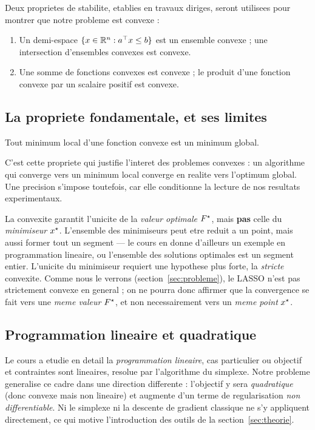 Deux proprietes de stabilite, etablies en travaux diriges, seront utilisees
pour montrer que notre probleme est convexe :
\begin{proposition}
\label{prop:stabilite}
\leavevmode
\begin{enumerate}
  \item Un demi-espace $\{x \in \mathbb{R}^{n} : a^{\top} x \le b\}$ est un ensemble convexe ;
        une intersection d'ensembles convexes est convexe.
  \item Une somme de fonctions convexes est convexe ; le produit d'une fonction
        convexe par un scalaire positif est convexe.
\end{enumerate}
\end{proposition}

\subsection{La propriete fondamentale, et ses limites}

\begin{theoreme}[Propriete-or]
\label{th:or}
Tout minimum local d'une fonction convexe est un minimum global.
\end{theoreme}

C'est cette propriete qui justifie l'interet des problemes convexes : un
algorithme qui converge vers un minimum local converge en realite vers
l'optimum global. Une precision s'impose toutefois, car elle conditionne la
lecture de nos resultats experimentaux.

\begin{remarque}
\label{rem:unicite}
La convexite garantit l'unicite de la \emph{valeur optimale} $F^{\star}$, mais
\textbf{pas} celle du \emph{minimiseur} $x^{\star}$. L'ensemble des minimiseurs
peut etre reduit a un point, mais aussi former tout un segment --- le cours en
donne d'ailleurs un exemple en programmation lineaire, ou l'ensemble des
solutions optimales est un segment entier. L'unicite du minimiseur requiert une
hypothese plus forte, la \emph{stricte} convexite. Comme nous le verrons
(section~\ref{sec:probleme}), le LASSO n'est pas strictement convexe en general ;
on ne pourra donc affirmer que la convergence se fait vers une \emph{meme valeur}
$F^{\star}$, et non necessairement vers un \emph{meme point} $x^{\star}$.
\end{remarque}

\subsection{Programmation lineaire et quadratique}

Le cours a etudie en detail la \emph{programmation lineaire}, cas particulier ou
objectif et contraintes sont lineaires, resolue par l'algorithme du simplexe.
Notre probleme generalise ce cadre dans une direction differente : l'objectif y
sera \emph{quadratique} (donc convexe mais non lineaire) et augmente d'un terme
de regularisation \emph{non differentiable}. Ni le simplexe ni la descente de
gradient classique ne s'y appliquent directement, ce qui motive l'introduction
des outils de la section~\ref{sec:theorie}.
